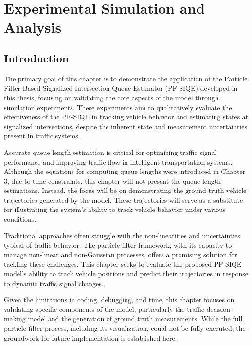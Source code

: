 \chapter{Experimental Simulation and Analysis}
\label{chapter:Experimental Design and Analysis}

\section{Introduction}

The primary goal of this chapter is to demonstrate the application of the Particle Filter-Based Signalized Intersection Queue Estimator (PF-SIQE) developed in this thesis, focusing on validating the core aspects of the model through simulation experiments. These experiments aim to qualitatively evaluate the effectiveness of the PF-SIQE in tracking vehicle behavior and estimating states at signalized intersections, despite the inherent state and measurement uncertainties present in traffic systems.

Accurate queue length estimation is critical for optimizing traffic signal performance and improving traffic flow in intelligent transportation systems. Although the equations for computing queue lengths were introduced in Chapter 3, due to time constraints, this chapter will not present the queue length estimations. Instead, the focus will be on demonstrating the ground truth vehicle trajectories generated by the model. These trajectories will serve as a substitute for illustrating the system's ability to track vehicle behavior under various conditions.

Traditional approaches often struggle with the non-linearities and uncertainties typical of traffic behavior. The particle filter framework, with its capacity to manage non-linear and non-Gaussian processes, offers a promising solution for tackling these challenges. This chapter seeks to evaluate the proposed PF-SIQE model’s ability to track vehicle positions and predict their trajectories in response to dynamic traffic signal changes.

Given the limitations in coding, debugging, and time, this chapter focuses on validating specific components of the model, particularly the traffic decision-making model and the generation of ground truth measurements. While the full particle filter process, including its visualization, could not be fully executed, the groundwork for future implementation is established here.

